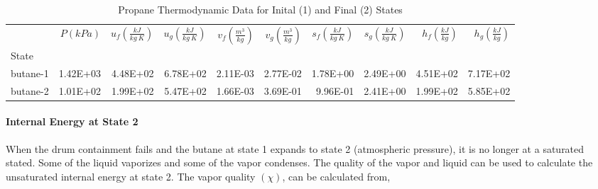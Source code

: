 \documentclass[10pt,parskip=half,
toc=sectionentrywithdots,
bibliography=totocnumbered,
captions=tableheading,numbers=noendperiod]{scrartcl}
\begin{document}
\begin{table}[H]
\caption{Propane Thermodynamic Data for Inital (1) and Final (2) States}\label{tbl:thermo}
\centering
\begin{adjustbox}{max width=\textwidth}
\begin{tabular}{lrrrrrrrrr}
\toprule
{} &  $P \left(kPa\right)$ &  $u_f \left(\frac{kJ}{kg\:K}\right)$ &  $u_g \left(\frac{kJ}{kg\:K}\right)$ &  $v_f \left(\frac{m^3}{kg}\right)$ &  $v_g \left(\frac{m^3}{kg}\right)$ &  $s_f \left(\frac{kJ}{kg\:K}\right)$ &  $s_g \left(\frac{kJ}{kg\:K}\right)$ &  $h_f \left(\frac{kJ}{kg}\right)$ &  $h_g \left(\frac{kJ}{kg}\right)$ \\
State    &                       &                                      &                                      &                                    &                                    &                                      &                                      &                                   &                                   \\
\midrule
butane-1 &              1.42E+03 &                             4.48E+02 &                             6.78E+02 &                           2.11E-03 &                           2.77E-02 &                             1.78E+00 &                             2.49E+00 &                          4.51E+02 &                          7.17E+02 \\
butane-2 &              1.01E+02 &                             1.99E+02 &                             5.47E+02 &                           1.66E-03 &                           3.69E-01 &                             9.96E-01 &                             2.41E+00 &                          1.99E+02 &                          5.85E+02 \\
\bottomrule
\end{tabular}

\end{adjustbox}
\end{table}

\hypertarget{internal-energy-at-state-2}{%
\paragraph{Internal Energy at State
2}\label{internal-energy-at-state-2}}

When the drum containment fails and the butane at state 1 expands to
state 2 (atmospheric pressure), it is no longer at a saturated stated.
Some of the liquid vaporizes and some of the vapor condenses. The
quality of the vapor and liquid can be used to calculate the unsaturated
internal energy at state 2. The vapor quality \((\chi)\), can be
calculated from,
\end{document}
